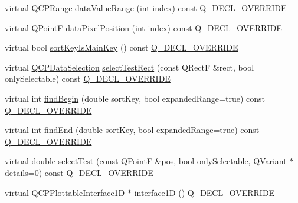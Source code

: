 \begin{DoxyCompactItemize}
\item 
virtual \mbox{\hyperlink{class_q_c_p_range}{Q\+C\+P\+Range}} \mbox{\hyperlink{class_q_c_p_error_bars_af71af55d929d832daf32e283b21e1f3e}{data\+Value\+Range}} (int index) const \mbox{\hyperlink{qcustomplot_8h_a42cc5eaeb25b85f8b52d2a4b94c56f55}{Q\+\_\+\+D\+E\+C\+L\+\_\+\+O\+V\+E\+R\+R\+I\+DE}}
\item 
virtual Q\+PointF \mbox{\hyperlink{class_q_c_p_error_bars_ae79fed6566f1912a97344b20b35faac1}{data\+Pixel\+Position}} (int index) const \mbox{\hyperlink{qcustomplot_8h_a42cc5eaeb25b85f8b52d2a4b94c56f55}{Q\+\_\+\+D\+E\+C\+L\+\_\+\+O\+V\+E\+R\+R\+I\+DE}}
\item 
virtual bool \mbox{\hyperlink{class_q_c_p_error_bars_af75958b95d9b9c7edfd9851c1d123850}{sort\+Key\+Is\+Main\+Key}} () const \mbox{\hyperlink{qcustomplot_8h_a42cc5eaeb25b85f8b52d2a4b94c56f55}{Q\+\_\+\+D\+E\+C\+L\+\_\+\+O\+V\+E\+R\+R\+I\+DE}}
\item 
virtual \mbox{\hyperlink{class_q_c_p_data_selection}{Q\+C\+P\+Data\+Selection}} \mbox{\hyperlink{class_q_c_p_error_bars_ad7c727736599dfb173f0952082e1a5b6}{select\+Test\+Rect}} (const Q\+RectF \&rect, bool only\+Selectable) const \mbox{\hyperlink{qcustomplot_8h_a42cc5eaeb25b85f8b52d2a4b94c56f55}{Q\+\_\+\+D\+E\+C\+L\+\_\+\+O\+V\+E\+R\+R\+I\+DE}}
\item 
virtual int \mbox{\hyperlink{class_q_c_p_error_bars_a74c57d6abb8eda3c4c31b72d1df9f568}{find\+Begin}} (double sort\+Key, bool expanded\+Range=true) const \mbox{\hyperlink{qcustomplot_8h_a42cc5eaeb25b85f8b52d2a4b94c56f55}{Q\+\_\+\+D\+E\+C\+L\+\_\+\+O\+V\+E\+R\+R\+I\+DE}}
\item 
virtual int \mbox{\hyperlink{class_q_c_p_error_bars_ad22dd8499c6d45176ad0651751a0b0b0}{find\+End}} (double sort\+Key, bool expanded\+Range=true) const \mbox{\hyperlink{qcustomplot_8h_a42cc5eaeb25b85f8b52d2a4b94c56f55}{Q\+\_\+\+D\+E\+C\+L\+\_\+\+O\+V\+E\+R\+R\+I\+DE}}
\item 
virtual double \mbox{\hyperlink{class_q_c_p_error_bars_ac1b6675ef43e32547a3cbcf7b7ac46ed}{select\+Test}} (const Q\+PointF \&pos, bool only\+Selectable, Q\+Variant $\ast$details=0) const \mbox{\hyperlink{qcustomplot_8h_a42cc5eaeb25b85f8b52d2a4b94c56f55}{Q\+\_\+\+D\+E\+C\+L\+\_\+\+O\+V\+E\+R\+R\+I\+DE}}
\item 
virtual \mbox{\hyperlink{class_q_c_p_plottable_interface1_d}{Q\+C\+P\+Plottable\+Interface1D}} $\ast$ \mbox{\hyperlink{class_q_c_p_error_bars_a0b6fbf3a943b4241ee485d066cc8562a}{interface1D}} () \mbox{\hyperlink{qcustomplot_8h_a42cc5eaeb25b85f8b52d2a4b94c56f55}{Q\+\_\+\+D\+E\+C\+L\+\_\+\+O\+V\+E\+R\+R\+I\+DE}}
\end{DoxyCompactItemize}
